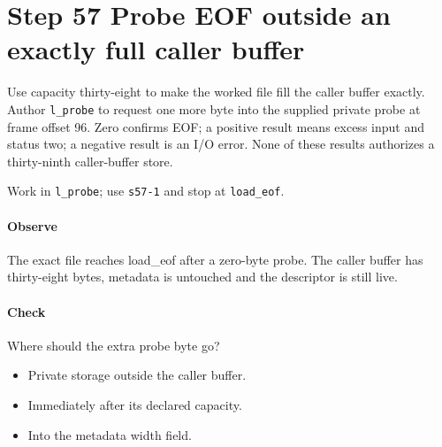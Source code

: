 \section{Step 57 Probe EOF outside an exactly full caller buffer}\label{qoi-s57}
Use capacity thirty-eight to make the worked file fill the caller buffer exactly. Author \texttt{l\_probe} to request one more byte into the supplied private probe at frame offset 96. Zero confirms EOF; a positive result means excess input and status two; a negative result is an I/O error. None of these results authorizes a thirty-ninth caller-buffer store.

Work in \texttt{l\_probe}; use \texttt{s57-1} and stop at \texttt{load\_eof}.

\paragraph{Observe} The exact file reaches load\_eof after a zero-byte probe. The caller buffer has thirty-eight bytes, metadata is untouched and the descriptor is still live.

\paragraph{Check} Where should the extra probe byte go?
\begin{itemize}
  \item[A.] Private storage outside the caller buffer.
  \item[B.] Immediately after its declared capacity.
  \item[C.] Into the metadata width field.
\end{itemize}
